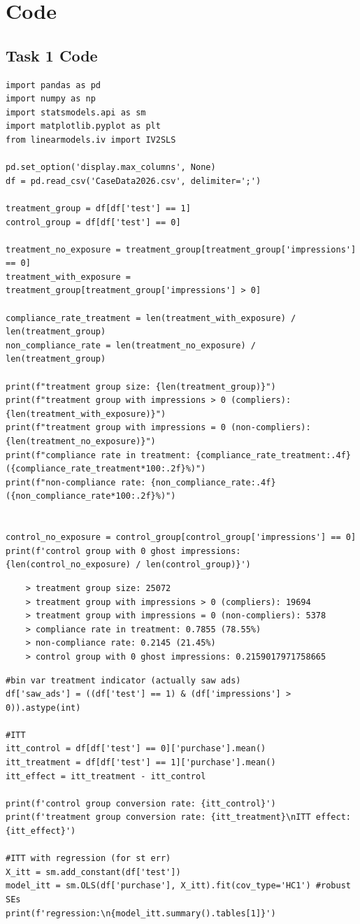 \documentclass[10pt]{article}
\begin{document}
\newpage
\appendix
\section{Code}
\subsection{Task 1 Code}
\label{app:task_one}
\begin{lstlisting}
import pandas as pd
import numpy as np 
import statsmodels.api as sm
import matplotlib.pyplot as plt 
from linearmodels.iv import IV2SLS
    
pd.set_option('display.max_columns', None)
df = pd.read_csv('CaseData2026.csv', delimiter=';')

treatment_group = df[df['test'] == 1]
control_group = df[df['test'] == 0]

treatment_no_exposure = treatment_group[treatment_group['impressions'] == 0]
treatment_with_exposure = treatment_group[treatment_group['impressions'] > 0]

compliance_rate_treatment = len(treatment_with_exposure) / len(treatment_group)
non_compliance_rate = len(treatment_no_exposure) / len(treatment_group)

print(f"treatment group size: {len(treatment_group)}")
print(f"treatment group with impressions > 0 (compliers): {len(treatment_with_exposure)}")
print(f"treatment group with impressions = 0 (non-compliers): {len(treatment_no_exposure)}")
print(f"compliance rate in treatment: {compliance_rate_treatment:.4f} ({compliance_rate_treatment*100:.2f}%)")
print(f"non-compliance rate: {non_compliance_rate:.4f} ({non_compliance_rate*100:.2f}%)")


control_no_exposure = control_group[control_group['impressions'] == 0]
print(f'control group with 0 ghost impressions: {len(control_no_exposure) / len(control_group)}')
\end{lstlisting}
\begin{verbatim}
    > treatment group size: 25072
    > treatment group with impressions > 0 (compliers): 19694
    > treatment group with impressions = 0 (non-compliers): 5378
    > compliance rate in treatment: 0.7855 (78.55%)
    > non-compliance rate: 0.2145 (21.45%)
    > control group with 0 ghost impressions: 0.2159017971758665
\end{verbatim}
\newpage 
\begin{lstlisting}
#bin var treatment indicator (actually saw ads)
df['saw_ads'] = ((df['test'] == 1) & (df['impressions'] > 0)).astype(int)

#ITT
itt_control = df[df['test'] == 0]['purchase'].mean()
itt_treatment = df[df['test'] == 1]['purchase'].mean()
itt_effect = itt_treatment - itt_control

print(f'control group conversion rate: {itt_control}')
print(f'treatment group conversion rate: {itt_treatment}\nITT effect: {itt_effect}')

#ITT with regression (for st err)
X_itt = sm.add_constant(df['test'])
model_itt = sm.OLS(df['purchase'], X_itt).fit(cov_type='HC1') #robust SEs 
print(f'regression:\n{model_itt.summary().tables[1]}')
\end{lstlisting}
\end{document}
